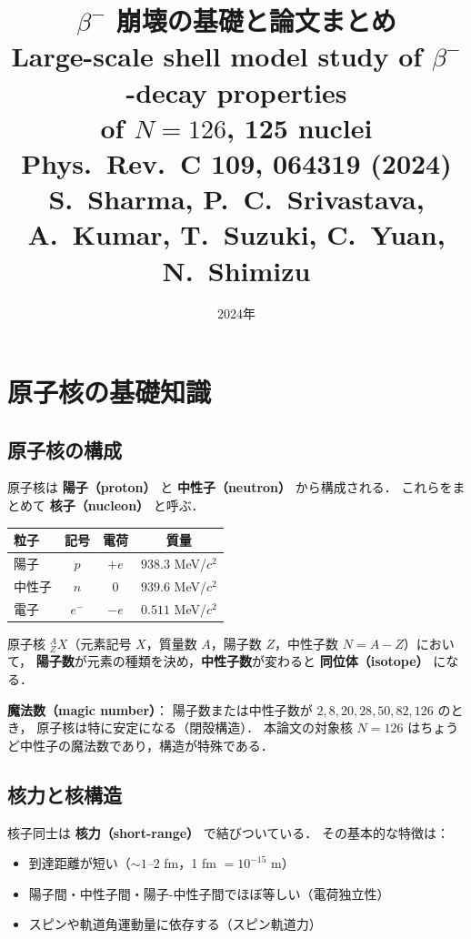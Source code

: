 \documentclass[12pt,a4paper]{ltjsarticle}
\title{\textbf{$\beta^-$ 崩壊の基礎と論文まとめ}\\[6pt]
\large Large-scale shell model study of $\beta^-$-decay properties\\
of $N=126$, 125 nuclei\\[4pt]
\normalsize Phys.\ Rev.\ C \textbf{109}, 064319 (2024) \quad [arXiv:2309.07903]\\
\small S.~Sharma, P.~C.~Srivastava, A.~Kumar, T.~Suzuki, C.~Yuan, N.~Shimizu}
\date{2024年}
\begin{document}
\maketitle
\tableofcontents
\newpage

\section{原子核の基礎知識}

\subsection{原子核の構成}

原子核は \textbf{陽子（proton）} と \textbf{中性子（neutron）} から構成される．
これらをまとめて \textbf{核子（nucleon）} と呼ぶ．

\begin{center}
\begin{tabular}{lccc}
\toprule
粒子 & 記号 & 電荷 & 質量 \\
\midrule
陽子 & $p$ & $+e$ & $938.3$ MeV/$c^2$ \\
中性子 & $n$ & $0$ & $939.6$ MeV/$c^2$ \\
電子 & $e^-$ & $-e$ & $0.511$ MeV/$c^2$ \\
\bottomrule
\end{tabular}
\end{center}

原子核 $^A_Z X$（元素記号 $X$，質量数 $A$，陽子数 $Z$，中性子数 $N = A-Z$）において，
\textbf{陽子数}が元素の種類を決め，\textbf{中性子数}が変わると \textbf{同位体（isotope）} になる．

\begin{point}
\textbf{魔法数（magic number）}：
陽子数または中性子数が $2, 8, 20, 28, 50, 82, 126$ のとき，
原子核は特に安定になる（閉殻構造）．
本論文の対象核 $N=126$ はちょうど中性子の魔法数であり，構造が特殊である．
\end{point}

\subsection{核力と核構造}

核子同士は \textbf{核力（short-range）} で結びついている．
その基本的な特徴は：
\begin{itemize}
  \item 到達距離が短い（$\sim 1\text{--}2$ fm，1 fm $= 10^{-15}$ m）
  \item 陽子間・中性子間・陽子-中性子間でほぼ等しい（電荷独立性）
  \item スピンや軌道角運動量に依存する（スピン軌道力）
\end{itemize}
\end{document}
